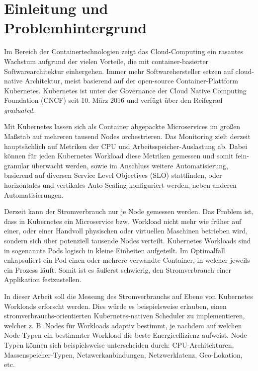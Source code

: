 \chapter{Einleitung und Problemhintergrund}

Im Bereich der Containertechnologien zeigt das Cloud-Computing ein rasantes Wachstum aufgrund der
vielen Vorteile, die mit container-basierter Softwarearchitektur einhergehen.
Immer mehr Softwarehersteller setzen auf cloud-native Architektur,
meist basierend auf der open-source Container-Plattform Kubernetes.
Kubernetes ist unter der Governance der Cloud Native Computing Foundation (CNCF) seit 10. März 2016
und verfügt über den Reifegrad \emph{graduated}.
\bigskip

Mit Kubernetes lassen sich als Container abgepackte Microservices im großen Maßstab auf
mehreren tausend Nodes orchestrieren.
Das Monitoring zielt derzeit hauptsächlich auf Metriken der CPU und Arbeitsspeicher-Auslastung ab.
Dabei können für jeden Kubernetes Workload diese Metriken gemessen und somit fein-granular überwacht werden,
sowie im Anschluss weitere Automatisierung, basierend auf diversen Service Level Objectives (SLO) stattfinden,
oder horizontales und vertikales Auto-Scaling konfiguriert werden, neben anderen Automatisierungen.
\bigskip

Derzeit kann der Stromverbrauch nur je Node gemessen werden.
Das Problem ist, dass in Kubernetes ein Microservice bzw. Workload nicht mehr wie früher
auf einer, oder einer Handvoll physischen oder virtuellen Maschinen betrieben wird,
sondern sich über potenziell tausende Nodes verteilt.
Kubernetes Workloads sind in sogenannte Pods logisch in kleine Einheiten aufgeteilt.
Im Optimalfall enkapsuliert ein Pod einen oder mehrere verwandte Container, in welcher jeweils ein Prozess läuft.
Somit ist es äußerst schwierig, den Stromverbrauch einer Applikation festzustellen.
\bigskip

In dieser Arbeit soll die Messung des Stromverbrauchs auf Ebene von Kubernetes Workloads erforscht werden.
Dies würde es beispielsweise erlauben, einen stromverbrauchs-orientierten Kubernetes-nativen
Scheduler zu implementieren, welcher z. B. Nodes für Workloads adaptiv bestimmt,
je nachdem auf welchen Node-Typen ein bestimmter Workload die beste Energieeffizienz aufweist.
Node-Typen können sich beispielsweise unterscheiden durch:
CPU-Architekturen, Massenspeicher-Typen, Netzwerkanbindungen, Netzwerklatenz, Geo-Lokation, etc.
\bigskip






